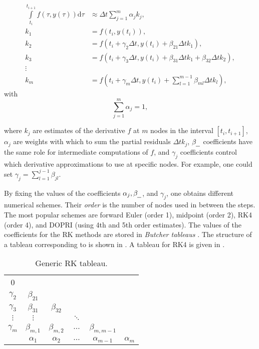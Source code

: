 \begin{align}
  \int \limits_{t_i}^{t_{i+1}} f(\tau, y(\tau)) \mathrm{d} \tau &\approx \Delta t \sum \limits_{j=1}^{m} \alpha_j k_j,\label{eq:rk_first}\\
  k_1 &= f(t_i, y(t_i)),\\
  k_2 &= f(t_i + \gamma_2 \Delta t, y(t_i) + \beta_{21} \Delta t k_1), \\
  k_3 &= f(t_i + \gamma_3 \Delta t, y(t_i) + \beta_{31} \Delta t k_1 + \beta_{32} \Delta t k_2),\\
  \vdots & \\
  k_m &= f(t_i + \gamma_m \Delta t, y(t_i) + \sum \limits_{l=1}^{m-1} \beta_{ml} \Delta t k_l), \label{eq:rk_last}
\end{align}
with
\begin{equation}
    \sum \limits_{j=1}^{m} \alpha_j = 1,
\end{equation}

where $k_j$ are estimates of the derivative $f$ at $m$ nodes in the interval $[t_i, t_{i+1}]$, $\alpha_j$ are weights with which to sum the partial residuals $\Delta t k_j$, $\beta_\text{\underline{\hspace{2mm}}}$ coefficients have the same role for intermediate computations of $f$, and $\gamma_j$ coefficients control which derivative approximations to use at specific nodes. For example, one could set $\gamma_j = \sum \limits_{l=1}^{j-1} \beta_{jl}$.

By fixing the values of the coefficients $\alpha_j, \beta_\text{\underline{\hspace{2mm}}}$, and $\gamma_j$, one obtains different numerical schemes. Their \emph{order} is the number of nodes used in between the steps. The most popular schemes are forward Euler (order 1), midpoint (order 2), \ac{RK}4 (order 4), and \ac{DOPRI} (using 4th and 5th order estimates). The values of the coefficients for the \ac{RK} methods are stored in \emph{Butcher tableaus} \cite{Atkinson2009}. The structure of a tableau corresponding to is shown in . A tableau for \ac{RK}4 is given in .

\begin{table}
  \centering
  \caption{Generic \acl{RK} tableau.}
  \begin{tabular}{c | c c c c c}
    0 & & & & &\\
    $\gamma_2$ & $\beta_{21}$ & & & &\\
    $\gamma_3$ & $\beta_{31}$ & $\beta_{32}$ & & &\\
    $\vdots$ & $\vdots$ & & $\ddots$ & &\\ 
    $\gamma_m$ & $\beta_{m,1}$ & $\beta_{m,2}$ & $\dots$ & $\beta_{m,m-1}$ &\\ \hline
           & $\alpha_1$ & $\alpha_2$ & $\dots$ & $\alpha_{m-1}$ & $\alpha_m$ \\
  \end{tabular}
  \label{tab:rk_tableau}
\end{table}

